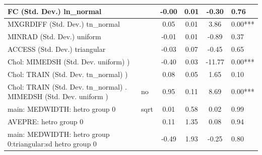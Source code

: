 \begin{table}
\begin{center}
\begin{tabular}{|l|l|c|c|c|l|}
			\hline
			FC (Std. Dev.) ln_normal &  & -0.00 & 0.01 & -0.30 & 0.76 \\
			\hline
			MXGRDIFF (Std. Dev.) tn_normal &  & 0.05 & 0.01 & 3.86 & 0.00*** \\
			\hline
			MINRAD (Std. Dev.) uniform &  & -0.01 & 0.01 & -0.89 & 0.37 \\
			\hline
			ACCESS (Std. Dev.) triangular &  & -0.03 & 0.07 & -0.45 & 0.65 \\
			\hline
			 Chol: MIMEDSH (Std. Dev. uniform) ) &  & -0.40 & 0.03 & -11.77 & 0.00*** \\
			\hline
			 Chol: TRAIN (Std. Dev. tn_normal) ) &  & 0.08 & 0.05 & 1.65 & 0.10 \\
			\hline
			 Chol: TRAIN (Std. Dev. tn_normal) . MIMEDSH (Std. Dev.   uniform ) & no & 0.95 & 0.11 & 8.69 & 0.00*** \\
			\hline
			main: MEDWIDTH: hetro group 0 & sqrt & 0.01 & 0.58 & 0.02 & 0.99 \\
			\hline
			AVEPRE: hetro group 0 &  & 0.11 & 1.35 & 0.08 & 0.94 \\
			\hline
			main: MEDWIDTH: hetro group 0:triangular:sd  hetro group 0 &  & -0.49 & 1.93 & -0.25 & 0.80 \\
			\hline
		\end{tabular}
	\end{center}
\end{table}